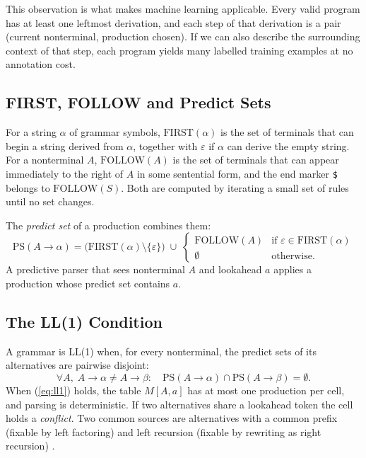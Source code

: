 \documentclass[12pt,a4paper]{article}
\newcommand{\tok}[1]{\texttt{#1}}
\begin{document}
This observation is what makes machine learning applicable. Every valid
program has at least one leftmost derivation, and each step of that derivation
is a pair (current nonterminal, production chosen). If we can also describe the
surrounding context of that step, each program yields many labelled training
examples at no annotation cost.

\subsection{FIRST, FOLLOW and Predict Sets}

For a string $\alpha$ of grammar symbols, $\mathrm{FIRST}(\alpha)$ is the set of
terminals that can begin a string derived from $\alpha$, together with
$\varepsilon$ if $\alpha$ can derive the empty string. For a nonterminal $A$,
$\mathrm{FOLLOW}(A)$ is the set of terminals that can appear immediately to
the right of $A$ in some sentential form, and the end marker \tok{\$} belongs to
$\mathrm{FOLLOW}(S)$. Both are computed by iterating a small set of rules until
no set changes.

The \emph{predict set} of a production combines them:
\begin{equation}
\mathrm{PS}(A\rightarrow\alpha)=
\bigl(\mathrm{FIRST}(\alpha)\setminus\{\varepsilon\}\bigr)\;\cup\;
\begin{cases}
\mathrm{FOLLOW}(A) & \text{if } \varepsilon\in\mathrm{FIRST}(\alpha)\\
\emptyset & \text{otherwise.}
\end{cases}
\label{eq:ps}
\end{equation}
A predictive parser that sees nonterminal $A$ and lookahead $a$ applies a
production whose predict set contains $a$.

\subsection{The LL(1) Condition}

A grammar is LL(1) when, for every nonterminal, the predict sets of its
alternatives are pairwise disjoint:
\begin{equation}
\forall A,\; A\rightarrow\alpha \neq A\rightarrow\beta:\quad
\mathrm{PS}(A\rightarrow\alpha)\cap\mathrm{PS}(A\rightarrow\beta)=\emptyset .
\label{eq:ll1}
\end{equation}
When (\ref{eq:ll1}) holds, the table $M[A,a]$ has at most one production per
cell, and parsing is deterministic. If two alternatives share a lookahead
token the cell holds a \emph{conflict}. Two common sources are alternatives
with a common prefix (fixable by left factoring) and left recursion (fixable
by rewriting as right recursion) \cite{aho2006,rosenkrantz1970}.
\end{document}
